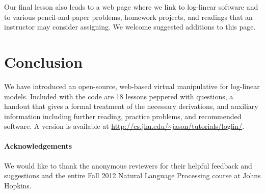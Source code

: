 \documentclass[11pt,letterpaper]{article}
\newcommand{\Note}[1]{}
\newcommand{\NoteSigned}[3]{{\sethlcolor{#2}\Note{#1: #3}}}
\newcommand{\NoteFF}[1]{\NoteSigned{FF}{LightBlue}{#1}}
\newcommand{\WhereToFind}[0]{\url{http://cs.jhu.edu/~jason/tutorials/loglin/}}
\newcommand{\NumLessons}[0]{18}%
\begin{document}


Our final lesson also leads to a web page where we link to log-linear
software and to various pencil-and-paper problems, homework projects,
and readings that an instructor may consider assigning.  We welcome
suggested additions to this page.


\section{Conclusion}
We have introduced an open-source, web-based virtual manipulative for
log-linear models. Included with the code are \NumLessons{} lessons
peppered with questions, a handout that gives a formal treatment of
the necessary derivations, and auxiliary information including
further reading, practice problems, and recommended software.  A
version is available at \WhereToFind{}.


\paragraph*{Acknowledgements}
We would like to thank the anonymous reviewers for their helpful feedback and suggestions 
and the entire Fall 2012 Natural Language Processing course at 
Johns Hopkins.




\end{document}
